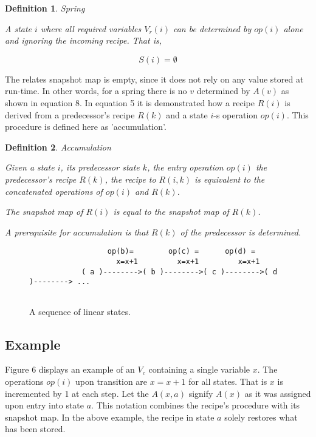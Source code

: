 \documentclass[12pt,a4paper]{scrartcl}
\newtheorem{definition}{Definition}
\begin{document}
\begin{definition}
Spring

A state $i$ where all required variables $V_r(i)$ can be determined by 
$op(i)$ alone and ignoring the incoming recipe. That is, 
\end{definition}

\begin{equation}
                          S(i) = \emptyset
\end{equation}

The relates snapshot map is empty, since it does not rely on any value stored
at run-time.  In other words, for a spring there is no $v$ determined by $A(v)$
as shown in equation 8.  In equation 5 it is demonstrated how a recipe $R(i)$
is derived from a predecessor's recipe $R(k)$ and a state $i$-s operation
$op(i)$. This procedure is defined here as 'accumulation'.

\begin{definition}
Accumulation

Given a state $i$, its predecessor state $k$, the entry operation $op(i)$
the predecessor's recipe $R(k)$, the recipe to $R(i,k)$ is equivalent
to the concatenated operations of $op(i)$ and $R(k)$.

The snapshot map of $R(i)$ is equal to the snapshot map of $R(k)$.

A prerequisite for accumulation is that $R(k)$ of the predecessor is 
determined.
\end{definition}

\begin{figure}[htbp] \leavevmode
\begin{verbatim}
                  op(b)=        op(c) =      op(d) =
                    x=x+1         x=x+1         x=x+1        
            ( a )-------->( b )-------->( c )-------->( d )--------> ...


\end{verbatim}
\caption{A sequence of linear states.}
\end{figure}

\subsection{Example}

Figure 6 displays an example of an $V_c$ containing a single variable $x$. The
operations $op(i)$ upon transition are $x=x+1$ for all states. That is $x$ is
incremented by 1 at each step. Let the $A(x,a)$ signify $A(x)$ as it was
assigned upon entry into state $a$. This notation combines the recipe's
procedure with its snapshot map. In the above example, the recipe in state $a$
solely restores what has been stored.
\end{document}
